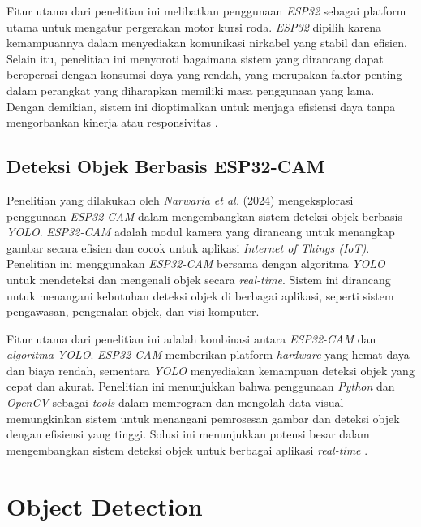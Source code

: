 Fitur utama dari penelitian ini melibatkan penggunaan \emph{ESP32} sebagai platform utama untuk mengatur pergerakan motor kursi roda. \emph{ESP32} dipilih karena kemampuannya dalam menyediakan komunikasi nirkabel yang stabil dan efisien. Selain itu, penelitian ini menyoroti bagaimana sistem yang dirancang dapat beroperasi dengan konsumsi daya yang rendah, yang merupakan faktor penting dalam perangkat yang diharapkan memiliki masa penggunaan yang lama. Dengan demikian, sistem ini dioptimalkan untuk menjaga efisiensi daya tanpa mengorbankan kinerja atau responsivitas \cite{ekatama2024perancangan}.

\subsection{Deteksi Objek Berbasis ESP32-CAM}
\label{subsec:deteksiobjekberbasisesp32cam}

Penelitian yang dilakukan oleh \emph{Narwaria et al.} (2024) mengeksplorasi penggunaan \emph{ESP32-CAM} dalam mengembangkan sistem deteksi objek berbasis \emph{YOLO}. \emph{ESP32-CAM} adalah modul kamera yang dirancang untuk menangkap gambar secara efisien dan cocok untuk aplikasi \emph{Internet of Things (IoT)}. Penelitian ini menggunakan \emph{ESP32-CAM} bersama dengan algoritma \emph{YOLO} untuk mendeteksi dan mengenali objek secara \emph{real-time}. Sistem ini dirancang untuk menangani kebutuhan deteksi objek di berbagai aplikasi, seperti sistem pengawasan, pengenalan objek, dan visi komputer.

Fitur utama dari penelitian ini adalah kombinasi antara \emph{ESP32-CAM} dan \emph{algoritma YOLO}. \emph{ESP32-CAM} memberikan platform \emph{hardware} yang hemat daya dan biaya rendah, sementara \emph{YOLO} menyediakan kemampuan deteksi objek yang cepat dan akurat. Penelitian ini menunjukkan bahwa penggunaan \emph{Python} dan \emph{OpenCV} sebagai \emph{tools} dalam memrogram dan mengolah data visual memungkinkan sistem untuk menangani pemrosesan gambar dan deteksi objek dengan efisiensi yang tinggi. Solusi ini menunjukkan potensi besar dalam mengembangkan sistem deteksi objek untuk berbagai aplikasi \emph{real-time} \cite{10696374}.

\section{Object Detection}
\label{sec:detection}

